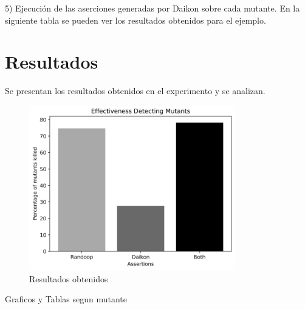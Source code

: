 
\vspace{10pt}

5) Ejecución de las aserciones generadas por Daikon sobre cada mutante. En la siguiente tabla se pueden ver los resultados obtenidos para el ejemplo.

\vspace{10pt}


\vspace{10pt}


\section{Resultados}

Se presentan los resultados obtenidos en el experimento y se analizan.

\begin{figure}[ht]
\centering
\includegraphics[width=0.8\textwidth]{tools-effectiveness.png}
\caption{Resultados obtenidos}
\label{fig:nombre_etiqueta}
\end{figure}

\vspace{10pt}


\vspace{10pt}



Graficos y Tablas segun mutante

\vspace{10pt}


\vspace{10pt}